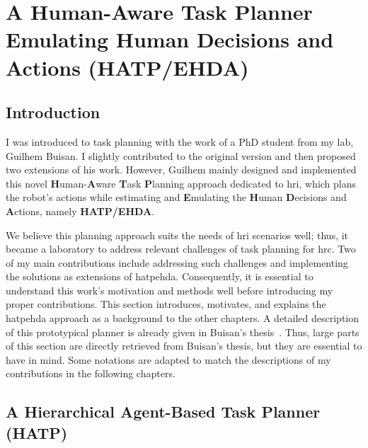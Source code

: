 \ifdefined{}
\else
\setcounter{chapter}{1} %
\dominitoc
\faketableofcontents
\fi

\chapter{A Human-Aware Task Planner Emulating Human Decisions and Actions (HATP/EHDA)}
\label{chap:2}
\minitoc


\section{Introduction}

I was introduced to task planning with the work of a PhD student from my lab, Guilhem Buisan. I slightly contributed to the original version and then proposed two extensions of his work. However, Guilhem mainly designed and implemented this novel \textbf{H}uman-\textbf{A}ware \textbf{T}ask \textbf{P}lanning approach dedicated to \acrfull{hri}, which plans the robot's actions while estimating and \textbf{E}mulating the \textbf{H}uman \textbf{D}ecisions and \textbf{A}ctions, namely \textbf{HATP/EHDA}. 

We believe this planning approach suits the needs of \acrshort{hri} scenarios well; thus, it became a laboratory to address relevant challenges of task planning for \acrshort{hrc}. 
Two of my main contributions include addressing such challenges and implementing the solutions as extensions of \acrshort{hatpehda}.   
Consequently, it is essential to understand this work's motivation and methods well before introducing my proper contributions. This section introduces, motivates, and explains the \acrshort{hatpehda} approach as a background to the other chapters. 
A detailed description of this prototypical planner is already given in Buisan's thesis~\cite{thesisBuisan21}. Thus, large parts of this section are directly retrieved from Buisan's thesis, but they are essential to have in mind. Some notations are adapted to match the descriptions of my contributions in the following chapters. 

\section{A Hierarchical Agent-Based Task Planner (HATP)}

